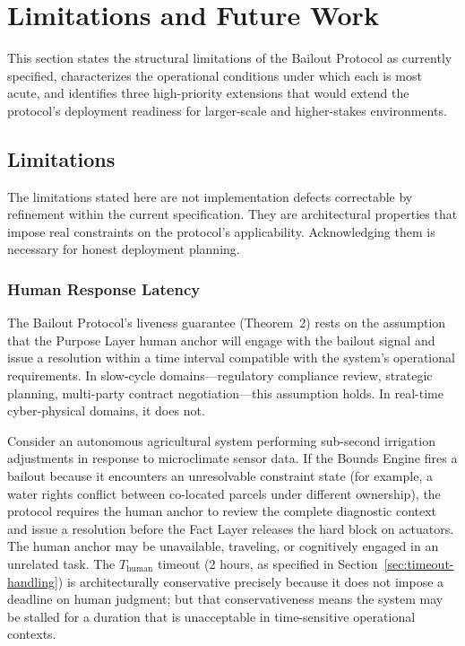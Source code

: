 \section{Limitations and Future Work}\label{sec:limitations}

This section states the structural limitations of the Bailout Protocol as currently specified, characterizes the operational conditions under which each is most acute, and identifies three high-priority extensions that would extend the protocol's deployment readiness for larger-scale and higher-stakes environments.

\subsection{Limitations}\label{sec:limitations:subsection}

The limitations stated here are not implementation defects correctable by refinement within the current specification. They are architectural properties that impose real constraints on the protocol's applicability. Acknowledging them is necessary for honest deployment planning.

\subsubsection{Human Response Latency}\label{sec:human-response-latency}

The Bailout Protocol's liveness guarantee (Theorem~2) rests on the assumption that the Purpose Layer human anchor will engage with the bailout signal and issue a resolution within a time interval compatible with the system's operational requirements. In slow-cycle domains---regulatory compliance review, strategic planning, multi-party contract negotiation---this assumption holds. In real-time cyber-physical domains, it does not.

Consider an autonomous agricultural system performing sub-second irrigation adjustments in response to microclimate sensor data. If the Bounds Engine fires a bailout because it encounters an unresolvable constraint state (for example, a water rights conflict between co-located parcels under different ownership), the protocol requires the human anchor to review the complete diagnostic context and issue a resolution before the Fact Layer releases the hard block on actuators. The human anchor may be unavailable, traveling, or cognitively engaged in an unrelated task. The $T_{\text{human}}$ timeout (2 hours, as specified in Section~\ref{sec:timeout-handling}) is architecturally conservative precisely because it does not impose a deadline on human judgment; but that conservativeness means the system may be stalled for a duration that is unacceptable in time-sensitive operational contexts.

